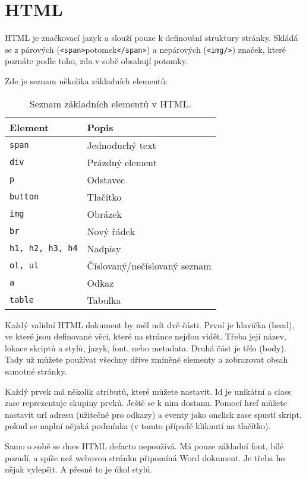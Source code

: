\section{HTML}



HTML je značkovací jazyk a slouží pouze k definování struktury stránky. Skládá se z párových (\texttt{<span>}potomek\texttt{</span>}) a nepárových (\texttt{<img/>}) značek, které poznáte podle toho, zda v sobě obsahují potomky.

Zde je seznam několika základních elementů:

\begin{table}[h!]
\centering
\begin{tabular}{|>{\centering\arraybackslash}m{4cm}|>{\centering\arraybackslash}m{5cm}|}
\hline
\textbf{Element} & \textbf{Popis} \\ \hline
\texttt{span} & Jednoduchý text \\ \hline
\texttt{div} & Prázdný element \\ \hline
\texttt{p} & Odstavec \\ \hline
\texttt{button} & Tlačítko \\ \hline
\texttt{img} & Obrázek \\ \hline
\texttt{br} & Nový řádek \\ \hline
\texttt{h1, h2, h3, h4} & Nadpisy \\ \hline
\texttt{ol, ul} & Číslovaný/nečíslovaný seznam \\ \hline
\texttt{a} & Odkaz \\ \hline
\texttt{table} & Tabulka \\ \hline
\end{tabular}
\caption{Seznam základních elementů v HTML.}
\end{table}

Každý validní HTML dokument by měl mít dvě části. První je hlavička (head), ve které jsou definované věci, které na stránce nejdou vidět. Třeba její název, lokace skriptů a stylů, jazyk, font, nebo metadata. Druhá část je tělo (body). Tady už můžete používat všechny dříve zmíněné elementy a zobrazovat obsah samotné stránky.

Každý prvek má několik atributů, které můžete nastavit. Id je unikátní a class zase reprezentuje skupiny prvků. Ještě se k nim dostanu. Pomocí href můžete nastavit url adresu (užitečné pro odkazy) a eventy jako onclick zase spustí skript, pokud se naplní nějaká podmínka (v tomto případě kliknutí na tlačítko).

Samo o sobě se dnes HTML defacto nepoužívá. Má pouze základní font, bílé pozadí, a spíše než webovou stránku připomíná Word dokument. Je třeba ho nějak vylepšit. A přesně to je úkol stylů.